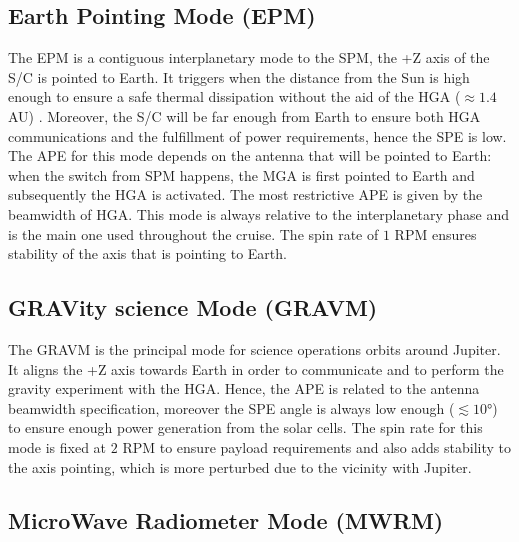 \subsection{Earth Pointing Mode (EPM)}
\label{subsec:earth_pointing_mode}

The EPM is a contiguous interplanetary mode to the SPM, the +Z axis of the S/C is pointed to Earth.
It triggers when the distance from the Sun is high enough to ensure a safe thermal dissipation without the aid of the HGA ($\approx 1.4$ AU) \cite{kurth}.
Moreover, the S/C will be far enough from Earth to ensure both HGA communications and the fulfillment of power requirements, hence the SPE is low. The APE for this mode depends on the antenna that will be pointed to Earth: when the switch from SPM happens, the MGA is first pointed to Earth and subsequently the HGA is activated. The most restrictive APE is given by the beamwidth of HGA. This mode is always relative to the interplanetary phase and is the main one used throughout the cruise. The spin rate of $1$ RPM ensures stability of the axis that is pointing to Earth.

\subsection{GRAVity science Mode (GRAVM)}
\label{subsec:grav_mode}

The GRAVM is the principal mode for science operations orbits around Jupiter. It aligns the +Z axis towards Earth in order to communicate and to perform the gravity experiment with the HGA.
Hence, the APE is related to the antenna beamwidth specification, moreover the SPE angle is always low enough ($\lesssim 10$°) \cite{stuart} to ensure enough power generation from the solar cells.
The spin rate for this mode is fixed at $2$ RPM to ensure payload requirements and also adds stability to the axis pointing, which is more perturbed due to the vicinity with Jupiter. 

\subsection{MicroWave Radiometer Mode (MWRM)}
\label{subsec:mwr_mode}

